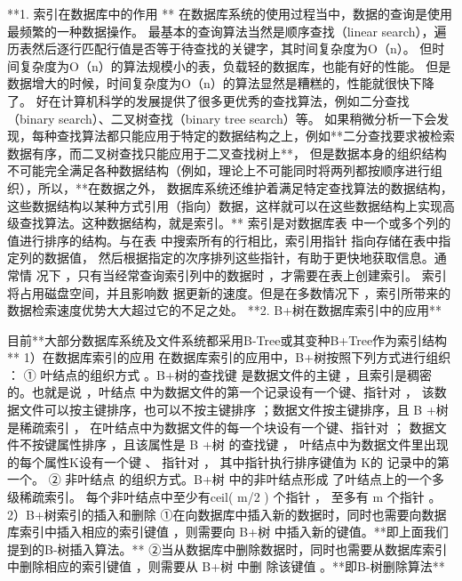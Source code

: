 \documentclass{book}
\begin{document}
**1. 索引在数据库中的作用 **
在数据库系统的使用过程当中，数据的查询是使用最频繁的一种数据操作。
最基本的查询算法当然是顺序查找（linear search），遍历表然后逐行匹配行值是否等于待查找的关键字，其时间复杂度为O（n）。
但时间复杂度为O（n）的算法规模小的表，负载轻的数据库，也能有好的性能。 但是数据增大的时候，时间复杂度为O（n）的算法显然是糟糕的，性能就很快下降了。
好在计算机科学的发展提供了很多更优秀的查找算法，例如二分查找（binary search）、二叉树查找（binary tree search）等。
如果稍微分析一下会发现，每种查找算法都只能应用于特定的数据结构之上，例如**二分查找要求被检索数据有序，而二叉树查找只能应用于二叉查找树上**，
但是数据本身的组织结构不可能完全满足各种数据结构（例如，理论上不可能同时将两列都按顺序进行组织），所以，**在数据之外，
数据库系统还维护着满足特定查找算法的数据结构，这些数据结构以某种方式引用（指向）数据，这样就可以在这些数据结构上实现高级查找算法。这种数据结构，就是索引。**
索引是对数据库表 中一个或多个列的值进行排序的结构。与在表 中搜索所有的行相比，索引用指针 指向存储在表中指定列的数据值，
然后根据指定的次序排列这些指针，有助于更快地获取信息。通常情 况下 ，只有当经常查询索引列中的数据时 ，才需要在表上创建索引。
索引将占用磁盘空间，并且影响数 据更新的速度。但是在多数情况下 ，索引所带来的数据检索速度优势大大超过它的不足之处。
**2. B+树在数据库索引中的应用**

目前**大部分数据库系统及文件系统都采用B-Tree或其变种B+Tree作为索引结构**
1）在数据库索引的应用
在数据库索引的应用中，B+树按照下列方式进行组织 ：
① 叶结点的组织方式 。B+树的查找键 是数据文件的主键 ，且索引是稠密的。也就是说 ，叶结点 中为数据文件的第一个记录设有一个键、指针对 ，
该数据文件可以按主键排序，也可以不按主键排序 ；数据文件按主键排序，且 B +树是稀疏索引 ， 在叶结点中为数据文件的每一个块设有一个键、指针对 ；
数据文件不按键属性排序 ，且该属性是 B +树 的查找键 ， 叶结点中为数据文件里出现的每个属性K设有一个键 、 指针对 ， 其中指针执行排序键值为 K的 记录中的第一个。
② 非叶结点 的组织方式。B+树 中的非叶结点形成 了叶结点上的一个多级稀疏索引。 每个非叶结点中至少有ceil( m/2 ) 个指针 ， 至多有 m 个指针 。 
2）B+树索引的插入和删除
①在向数据库中插入新的数据时，同时也需要向数据库索引中插入相应的索引键值 ，则需要向 B+树 中插入新的键值。**即上面我们提到的B-树插入算法。**
②当从数据库中删除数据时，同时也需要从数据库索引中删除相应的索引键值 ，则需要从 B+树 中删 除该键值 。**即B-树删除算法**
\end{document}
